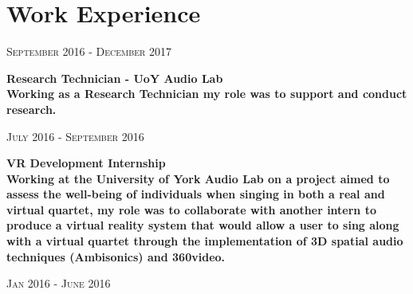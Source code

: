 \documentclass[10pt]{article}
\begin{document}
\begin{minipage}[t]{0.74\textwidth}

    \section{Work Experience}

    \begin{center}
        {\textsc{September 2016 - December 2017}}\\
    \end{center}

        \bf{Research Technician - UoY Audio Lab} \\
            Working as a Research Technician my role was to support and conduct research.

            



            
    
	\begin{center}
    	{\textsc{July 2016 - September 2016}}\\
    \end{center}

    \hspace{-6mm}
	\bf{VR Development Internship} \\

	\normalfont Working at the University of York Audio Lab on a project aimed to assess the well-being of individuals when singing in both a real and virtual quartet, my role was to collaborate with another intern to produce a virtual reality system that would allow a user to sing along with a virtual quartet through the implementation of 3D spatial audio techniques (Ambisonics) and 360\degree video.


    \begin{center}
    	{\textsc{Jan 2016 - June 2016}}\\
    \end{center}


\end{minipage}
\end{document}
